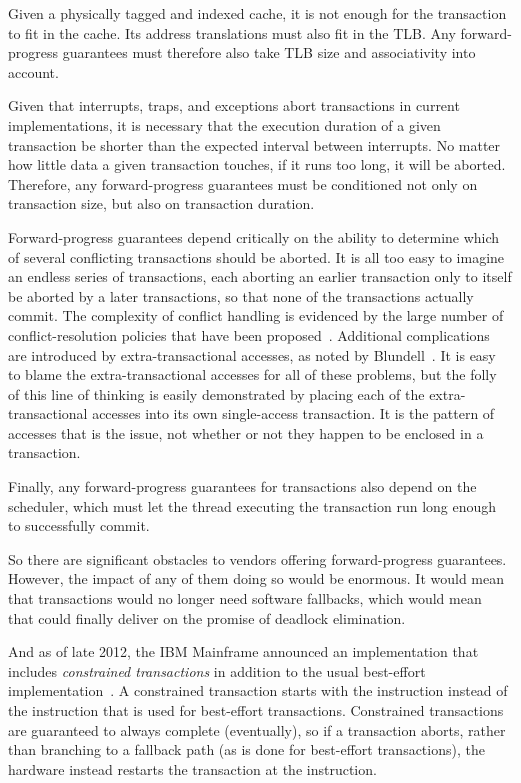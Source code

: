 Given a physically tagged and indexed cache, it is not enough for the
transaction to fit in the cache.
Its address translations must also fit in the TLB.
Any forward-progress guarantees must therefore also take TLB size
and associativity into account.

Given that interrupts, traps, and exceptions abort transactions in current
 implementations, it is necessary that the execution duration of
a given transaction be shorter than the expected interval between
interrupts.
No matter how little data a given transaction touches, if it runs too
long, it will be aborted.
Therefore, any forward-progress guarantees must be conditioned not only
on transaction size, but also on transaction duration.

Forward-progress guarantees depend critically on the ability to determine
which of several conflicting transactions should be aborted.
It is all too easy to imagine an endless series of transactions, each
aborting an earlier transaction only to itself be aborted by a later
transactions, so that none of the transactions actually commit.
The complexity of conflict handling is
evidenced by the large number of  conflict-resolution policies
that have been proposed~\cite{EgeAkpinar2011HTM2TLE,YujieLiu2011ToxicTransactions}.
Additional complications are introduced by extra-transactional accesses,
as noted by Blundell~\cite{Blundell2006TMdeadlock}.
It is easy to blame the extra-transactional accesses for all of these
problems, but the folly of this line of thinking is easily demonstrated
by placing each of the extra-transactional accesses into its own
single-access transaction.
It is the pattern of accesses that is the issue, not whether or not they
happen to be enclosed in a transaction.

Finally, any forward-progress guarantees for transactions also
depend on the scheduler, which must let the thread executing the
transaction run long enough to successfully commit.

So there are significant obstacles to  vendors offering forward-progress
guarantees.
However, the impact of any of them doing so would be enormous.
It would mean that  transactions would no longer need software
fallbacks, which would mean that  could finally deliver on the
 promise of deadlock elimination.

And as of late 2012, the IBM Mainframe announced an 
implementation that includes \emph{constrained transactions}
in addition to the usual best-effort 
implementation~\cite{ChristianJacobi2012MainframeTM}.
A constrained transaction starts with the  instruction
instead of the  instruction that is used for best-effort
transactions.
Constrained transactions are guaranteed to always complete (eventually),
so if a transaction aborts, rather than branching to a fallback path
(as is done for best-effort transactions), the hardware instead restarts
the transaction at the  instruction.

